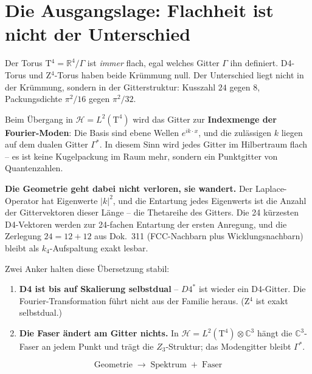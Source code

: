 \chapter{Die Ausgangslage: Flachheit ist nicht der Unterschied}

Der Torus T$^4 = \mathbb{R}^4/\Gamma$ ist \emph{immer} flach, egal
welches Gitter $\Gamma$ ihn definiert. D4-Torus und Z$^4$-Torus
haben beide Krümmung null. Der Unterschied liegt nicht in der
Krümmung, sondern in der Gitterstruktur: Kusszahl $24$ gegen $8$,
Packungsdichte $\pi^2/16$ gegen $\pi^2/32$.

Beim Übergang in $\mathcal{H} = L^2(\text{T}^4)$ wird das Gitter zur
\textbf{Indexmenge der Fourier-Moden}: Die Basis sind ebene Wellen
$e^{ik\cdot x}$, und die zulässigen $k$ liegen auf dem dualen Gitter
$\Gamma^{*}$. In diesem Sinn wird jedes Gitter im Hilbertraum
flach -- es ist keine Kugelpackung im Raum mehr, sondern ein
Punktgitter von Quantenzahlen.

\textbf{Die Geometrie geht dabei nicht verloren, sie wandert.} Der
Laplace-Operator hat Eigenwerte $|k|^2$, und die Entartung jedes
Eigenwerts ist die Anzahl der Gittervektoren dieser Länge -- die
Thetareihe des Gitters. Die 24 kürzesten D4-Vektoren werden zur
24-fachen Entartung der ersten Anregung, und die Zerlegung
$24 = 12+12$ aus Dok.~311 (FCC-Nachbarn plus Wicklungsnachbarn)
bleibt als $k_4$-Aufspaltung exakt lesbar.

Zwei Anker halten diese Übersetzung stabil:

\begin{enumerate}
  \item \textbf{D4 ist bis auf Skalierung selbstdual} -- $D4^{*}$
        ist wieder ein D4-Gitter. Die Fourier-Transformation führt
        nicht aus der Familie heraus. (Z$^4$ ist exakt selbstdual.)
  \item \textbf{Die Faser ändert am Gitter nichts.} In
        $\mathcal{H} = L^2(\text{T}^4)\otimes\mathbb{C}^3$ hängt die
        $\mathbb{C}^3$-Faser an jedem Punkt und trägt die
        $Z_3$-Struktur; das Modengitter bleibt $\Gamma^{*}$.
\end{enumerate}

\begin{equation}
  \boxed{\;\text{Geometrie}\;\longrightarrow\;
  \text{Spektrum}\;+\;\text{Faser}\;}
\end{equation}

